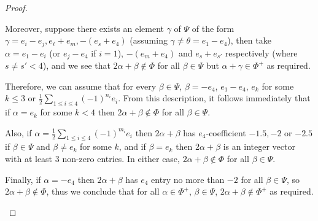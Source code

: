 \documentclass[12pt,a4paper]{article}
\theoremstyle{definition}
\theoremstyle{remark}
\theoremstyle{custthm}
\begin{document}
\begin{proof}
\begin{enumerate}
    Moreover, suppose there exists an element $\gamma$ of $\Psi$ of the form $\gamma=e_i-e_j,e_\ell+e_m,-(e_s+e_4)$ (assuming $\gamma\neq\theta= e_1-e_4$), then take $\alpha=e_1-e_i$ (or $e_j-e_4$ if $i=1$), $-(e_m+e_4)$ and $e_s+e_{s'}$ respectively (where $s\neq s'<4$), and we see that $2\alpha+\beta\notin\Phi$ for all $\beta\in\Psi$ but $\alpha+\gamma\in\Phi^+$ as required.

    Therefore, we can assume that for every $\beta\in\Psi$, $\beta=-e_4$, $e_1-e_4$, $e_k$ for some $k\leq 3$ or $\frac{1}{2}\underset{1\leq i\leq 4}{\sum}(-1)^{n_i}e_i$. From this description, it follows immediately that if $\alpha=e_k$ for some $k<4$ then $2\alpha+\beta\notin\Phi$ for all $\beta\in\Psi$.
    
    Also, if $\alpha=\frac{1}{2}\underset{1\leq i\leq 4}{\sum}(-1)^{m_i}e_i$ then $2\alpha+\beta$ has $e_4$-coefficient $-1.5,-2$ or $-2.5$ if $\beta\in\Psi$ and $\beta\neq e_k$ for some $k$, and if $\beta=e_k$ then $2\alpha+\beta$ is an integer vector with at least 3 non-zero entries. In either case, $2\alpha+\beta\notin\Phi$ for all $\beta\in\Psi$.

    Finally, if $\alpha=-e_4$ then $2\alpha+\beta$ has $e_4$ entry no more than $-2$ for all $\beta\in\Psi$, so $2\alpha+\beta\notin\Phi$, thus we conclude that for all $\alpha\in\Phi^+$, $\beta\in\Psi$, $2\alpha+\beta\notin\Phi^+$ as required.

    



\end{enumerate}
\end{proof}
\end{document}
